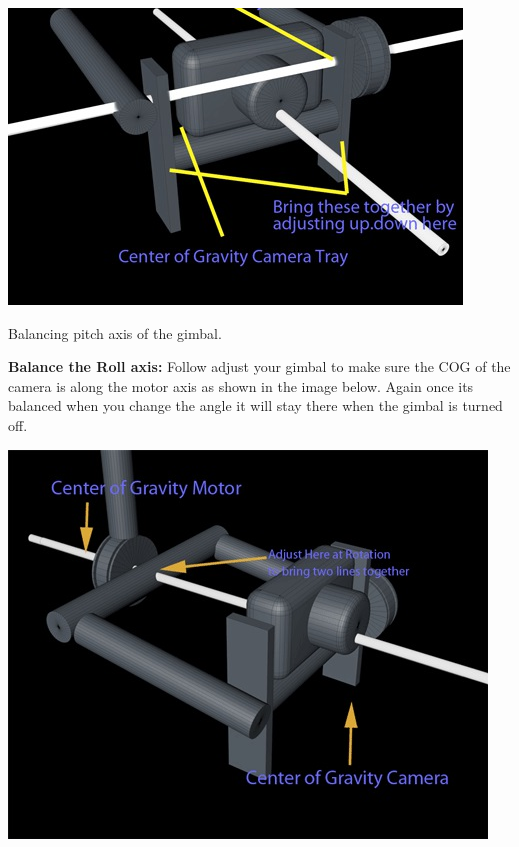 \documentclass[11pt,a4paper]{article}
\begin{document}
		\begin{center}
			\includegraphics[scale=2.1]{balancing_pitch_2.jpg}
		\end{center}
		\begin{center}
			Balancing pitch axis of the gimbal.
		\end{center}
		\textbf{Balance the Roll axis:}
		\newline
		Follow adjust your gimbal to make sure the COG of the camera is along the motor axis as shown in the image below. Again once its balanced when you change the angle it will stay there when the gimbal is turned off.
		\newline
		\begin{center}
			\includegraphics[scale=0.7]{balancing_roll_1.jpg}
		\end{center}
\end{document}
